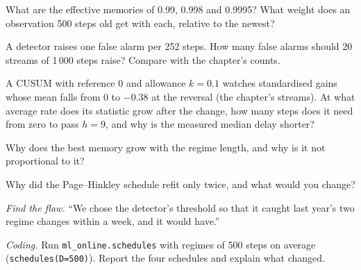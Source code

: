 \begin{exercise}[$\star$]\label{exo:ml:online-learning-and-drift:1}
What are the effective memories of  0.99, 0.998 and 0.9995? What weight does an observation 500 steps old
get with each, relative to the newest?
\end{exercise}

\begin{exercise}[$\star$]\label{exo:ml:online-learning-and-drift:2}
A detector raises one false alarm per 252 steps. How many false alarms should 20 streams of 1\,000 steps raise? Compare with
the chapter's counts.
\end{exercise}

\begin{exercise}[$\star$]\label{exo:ml:online-learning-and-drift:3}
A CUSUM with reference 0 and allowance $k = 0.1$ watches standardised gains whose mean falls from 0 to $-0.38$ at the
reversal (the chapter's streams). At what average rate does its statistic grow after the change, how many steps does it
need from zero to pass $h = 9$, and why is the measured median delay shorter?
\end{exercise}

\begin{exercise}[$\star\star$]\label{exo:ml:online-learning-and-drift:4}
Why does the best memory grow with the regime length, and why is it not proportional to it?
\end{exercise}

\begin{exercise}[$\star\star$]\label{exo:ml:online-learning-and-drift:5}
Why did the Page--Hinkley schedule refit only twice, and what would you change?
\end{exercise}

\begin{exercise}[$\star\star$]\label{exo:ml:online-learning-and-drift:6}
\emph{Find the flaw.} ``We chose the detector's threshold so that it caught last year's two regime changes within a week,
and it would have.''
\end{exercise}

\begin{exercise}[$\star\star\star$]\label{exo:ml:online-learning-and-drift:7}
\emph{Coding.} Run \texttt{ml\_online.schedules} with regimes of 500 steps on average (\texttt{schedules(D=500)}). Report the
four schedules and explain what changed.
\end{exercise}

